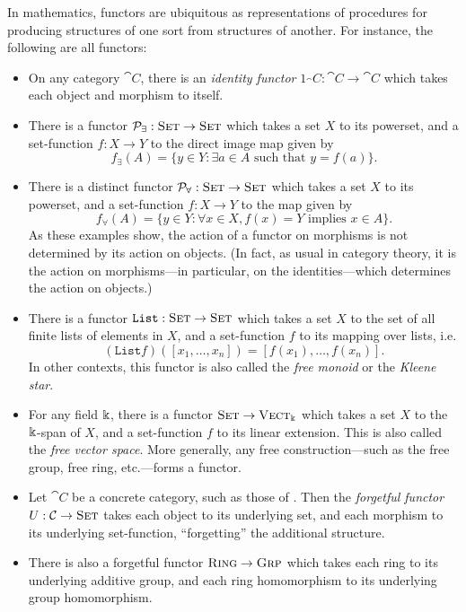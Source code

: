 \begin{ex}
  In mathematics, functors are ubiquitous as representations of procedures for
  producing structures of one sort from structures of another. For instance, the
  following are all functors:
  \begin{itemize}
    \item On any category $\cat{C}$, there is an \emph{identity functor}
      $1_\cat{C}: \cat{C}\to\cat{C}$ which takes each object and morphism to
      itself.
    \item There is a functor $\mathcal{P}_\exists: {\textsc{\text{Set}}}\to{\textsc{\text{Set}}}$ which takes
      a set $X$ to its powerset, and a set-function $f: X\to Y$ to the direct
      image map given by \[
        f_\exists(A) = \{y\in Y: \exists a\in A \text{ such that } y = f(a)\}.
      \]
    \item There is a distinct functor $\mathcal{P}_\forall: {\textsc{\text{Set}}}\to{\textsc{\text{Set}}}$
      which takes a set $X$ to its powerset, and a set-function $f: X\to Y$ to
      the map given by \[
        f_\forall(A) = \{y\in Y: \forall x\in X, f(x) = Y \text{ implies } x\in A\}.
      \] As these examples show, the action of a functor on morphisms is not
      determined by its action on objects. (In fact, as usual in category
      theory, it is the action on morphisms---in particular, on the
      identities---which determines the action on objects.)
    \item There is a functor $\texttt{List}: {\textsc{\text{Set}}}\to{\textsc{\text{Set}}}$ which
      takes a set $X$ to the set of all finite lists of elements in $X$, and a
      set-function $f$ to its mapping over lists, i.e. \[
        (\texttt{List}f)([x_1, \ldots, x_n]) = [f(x_1), \ldots, f(x_n)].
      \]  In other contexts, this functor is also called the \emph{free
      monoid} or the \emph{Kleene star}.
    \item For any field $\Bbbk$, there is a functor ${\textsc{\text{Set}}}\to{\textsc{\text{Vect}}}_\Bbbk$ which
      takes a set $X$ to the $\Bbbk$-span of $X$, and a set-function $f$ to
      its linear extension. This is also called the \emph{free vector space}.
      More generally, any free construction---such as the free group, free ring,
      etc.---forms a functor.
    \item Let $\cat{C}$ be a concrete category, such as those of .
      Then the \emph{forgetful functor} $U: {\mathcal{C}}\to{\textsc{\text{Set}}}$ takes each object to
      its underlying set, and each morphism to its underlying set-function,
      ``forgetting'' the additional structure.
    \item There is also a forgetful functor ${\textsc{\text{Ring}}}\to{\textsc{\text{Grp}}}$ which
      takes each ring to its underlying additive group, and each ring
      homomorphism to its underlying group homomorphism.
  \end{itemize}
\end{ex}


